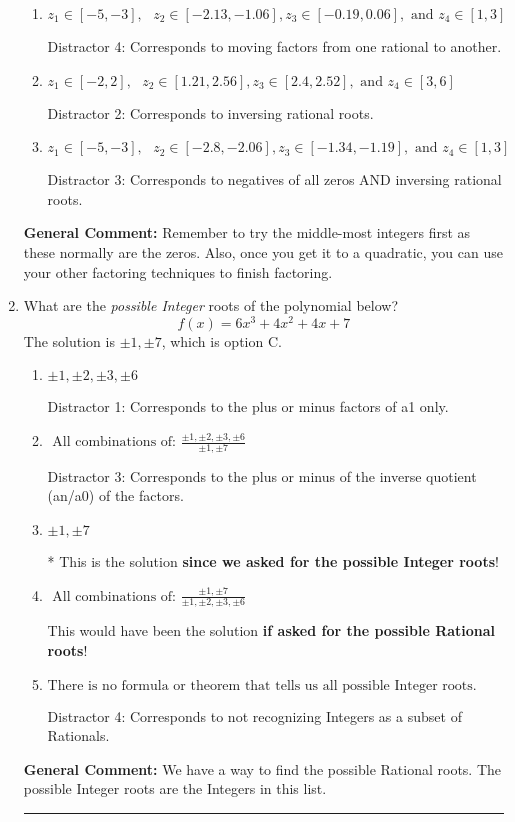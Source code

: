 \documentclass{extbook}[14pt]
\newcommand{\litem}[1]{\item #1

\rule{\textwidth}{0.4pt}}
\begin{document}
\begin{enumerate}
{\begin{enumerate}[label=\Alph*.]
 Distractor 1: Corresponds to negatives of all zeros.
\item \( z_1 \in [-5, -3], \text{   }  z_2 \in [-2.13, -1.06], z_3 \in [-0.19, 0.06], \text{   and   } z_4 \in [1, 3] \)

 Distractor 4: Corresponds to moving factors from one rational to another.
\item \( z_1 \in [-2, 2], \text{   }  z_2 \in [1.21, 2.56], z_3 \in [2.4, 2.52], \text{   and   } z_4 \in [3, 6] \)

 Distractor 2: Corresponds to inversing rational roots.
\item \( z_1 \in [-5, -3], \text{   }  z_2 \in [-2.8, -2.06], z_3 \in [-1.34, -1.19], \text{   and   } z_4 \in [1, 3] \)

 Distractor 3: Corresponds to negatives of all zeros AND inversing rational roots.
\end{enumerate}

\textbf{General Comment:} Remember to try the middle-most integers first as these normally are the zeros. Also, once you get it to a quadratic, you can use your other factoring techniques to finish factoring.
}
\litem{
What are the \textit{possible Integer} roots of the polynomial below?
\[ f(x) = 6x^{3} +4 x^{2} +4 x + 7 \]The solution is \( \pm 1,\pm 7 \), which is option C.\begin{enumerate}[label=\Alph*.]
\item \( \pm 1,\pm 2,\pm 3,\pm 6 \)

 Distractor 1: Corresponds to the plus or minus factors of a1 only.
\item \( \text{ All combinations of: }\frac{\pm 1,\pm 2,\pm 3,\pm 6}{\pm 1,\pm 7} \)

 Distractor 3: Corresponds to the plus or minus of the inverse quotient (an/a0) of the factors. 
\item \( \pm 1,\pm 7 \)

* This is the solution \textbf{since we asked for the possible Integer roots}!
\item \( \text{ All combinations of: }\frac{\pm 1,\pm 7}{\pm 1,\pm 2,\pm 3,\pm 6} \)

This would have been the solution \textbf{if asked for the possible Rational roots}!
\item \( \text{There is no formula or theorem that tells us all possible Integer roots.} \)

 Distractor 4: Corresponds to not recognizing Integers as a subset of Rationals.
\end{enumerate}

\textbf{General Comment:} We have a way to find the possible Rational roots. The possible Integer roots are the Integers in this list.
}
\end{enumerate}
\end{document}
